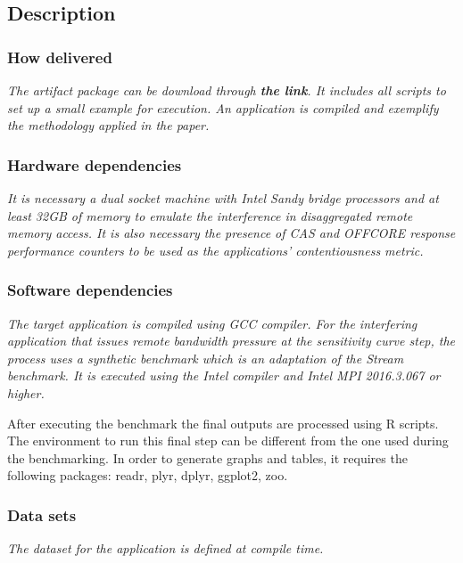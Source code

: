 \documentclass{sigplanconf}
\begin{document}
{%
\subsection{Description}

\subsubsection{How delivered}

{\em The artifact package can be download through {\bf the link}. It includes all scripts to set up a small example for execution. An application is compiled and exemplify the methodology applied in the paper. }

\subsubsection{Hardware dependencies}

{\em It is necessary a dual socket machine with Intel Sandy bridge processors and at least 32GB of memory to emulate the interference in disaggregated remote memory access. It is also necessary the presence of CAS and OFFCORE response performance counters to be used as the applications' contentiousness metric. }

\subsubsection{Software dependencies}

{\em The target application is compiled using GCC compiler. For the interfering application that issues remote bandwidth pressure at the sensitivity curve step, the process uses a synthetic benchmark which is an adaptation of the Stream benchmark. It is executed using the Intel compiler and Intel MPI 2016.3.067 or higher.

After executing the benchmark the final outputs are processed using R scripts. The environment to run this final step can be different from the one used during the benchmarking. In order to generate graphs and tables, it requires the following packages: readr, plyr, dplyr, ggplot2, zoo. 
}

\subsubsection{Data sets}

{\em The dataset for the application is defined at compile time.}

}
\end{document}
